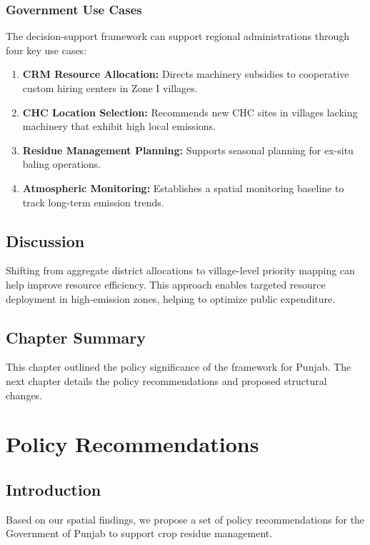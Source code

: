 \documentclass[12pt,a4paper]{report}
\begin{document}
\subsection{Government Use Cases}
The decision-support framework can support regional administrations through four key use cases:
\begin{enumerate}
    \item \textbf{CRM Resource Allocation:} Directs machinery subsidies to cooperative custom hiring centers in Zone I villages.
    \item \textbf{CHC Location Selection:} Recommends new CHC sites in villages lacking machinery that exhibit high local emissions.
    \item \textbf{Residue Management Planning:} Supports seasonal planning for ex-situ baling operations.
    \item \textbf{Atmospheric Monitoring:} Establishes a spatial monitoring baseline to track long-term emission trends.
\end{enumerate}

\section{Discussion}
Shifting from aggregate district allocations to village-level priority mapping can help improve resource efficiency. This approach enables targeted resource deployment in high-emission zones, helping to optimize public expenditure.

\section{Chapter Summary}
This chapter outlined the policy significance of the framework for Punjab. The next chapter details the policy recommendations and proposed structural changes.

\chapter{Policy Recommendations}
\label{ch:policy_recs}

\section{Introduction}
Based on our spatial findings, we propose a set of policy recommendations for the Government of Punjab to support crop residue management.
\end{document}
